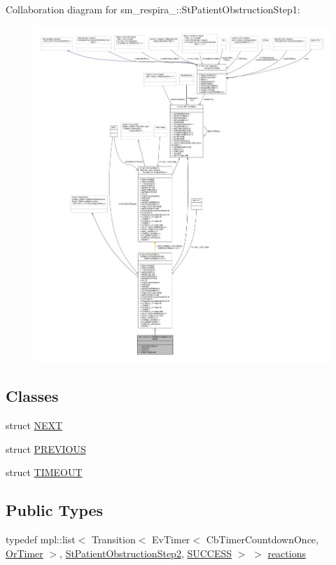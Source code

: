 Collaboration diagram for sm\+\_\+respira\+\_\+:\+:St\+Patient\+Obstruction\+Step1\+:
\nopagebreak
\begin{figure}[H]
\begin{center}
\leavevmode
\includegraphics[width=350pt]{structsm__respira__1_1_1StPatientObstructionStep1__coll__graph}
\end{center}
\end{figure}
\subsection*{Classes}
\begin{DoxyCompactItemize}
\item 
struct \hyperlink{structsm__respira__1_1_1StPatientObstructionStep1_1_1NEXT}{N\+E\+XT}
\item 
struct \hyperlink{structsm__respira__1_1_1StPatientObstructionStep1_1_1PREVIOUS}{P\+R\+E\+V\+I\+O\+US}
\item 
struct \hyperlink{structsm__respira__1_1_1StPatientObstructionStep1_1_1TIMEOUT}{T\+I\+M\+E\+O\+UT}
\end{DoxyCompactItemize}
\subsection*{Public Types}
\begin{DoxyCompactItemize}
\item 
typedef mpl\+::list$<$ Transition$<$ Ev\+Timer$<$ Cb\+Timer\+Countdown\+Once, \hyperlink{classsm__respira__1_1_1OrTimer}{Or\+Timer} $>$, \hyperlink{structsm__respira__1_1_1StPatientObstructionStep2}{St\+Patient\+Obstruction\+Step2}, \hyperlink{classSUCCESS}{S\+U\+C\+C\+E\+SS} $>$ $>$ \hyperlink{structsm__respira__1_1_1StPatientObstructionStep1_ad2c374ebfe1ef64492c0beb0b7d11fc1}{reactions}
\end{DoxyCompactItemize}
